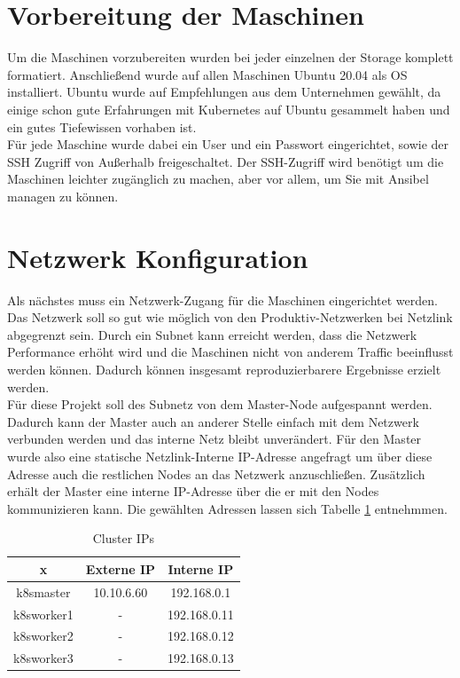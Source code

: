 \section{Vorbereitung der Maschinen}
Um die Maschinen vorzubereiten wurden bei jeder einzelnen der Storage komplett formatiert.
Anschließend wurde auf allen Maschinen Ubuntu 20.04 als \ac{OS} installiert.
Ubuntu wurde auf Empfehlungen aus dem Unternehmen gewählt, da einige schon gute Erfahrungen mit Kubernetes auf Ubuntu gesammelt haben und ein gutes Tiefewissen vorhaben ist.
\\
Für jede Maschine wurde dabei ein User und ein Passwort eingerichtet, sowie der \ac{SSH} Zugriff von Außerhalb freigeschaltet.
Der SSH-Zugriff wird benötigt um die Maschinen leichter zugänglich zu machen, aber vor allem, um Sie mit Ansibel managen zu können.


\section{Netzwerk Konfiguration}
Als nächstes muss ein Netzwerk-Zugang für die Maschinen eingerichtet werden.
Das Netzwerk soll so gut wie möglich von den Produktiv-Netzwerken bei Netzlink abgegrenzt sein.
Durch ein Subnet kann erreicht werden, dass die Netzwerk Performance erhöht wird und die Maschinen nicht von anderem Traffic beeinflusst werden können.
Dadurch können insgesamt reproduzierbarere Ergebnisse erzielt werden. 
\\
Für diese Projekt soll des Subnetz von dem Master-Node aufgespannt werden. 
Dadurch kann der Master auch an anderer Stelle einfach mit dem Netzwerk verbunden werden und das interne Netz bleibt unverändert.
Für den Master wurde also eine statische Netzlink-Interne \ac{IP}-Adresse angefragt um über diese Adresse auch die restlichen Nodes an das Netzwerk anzuschließen.
Zusätzlich erhält der Master eine interne \ac{IP}-Adresse über die er mit den Nodes kommunizieren kann.
Die gewählten Adressen lassen sich Tabelle \ref{table:katanetes_ips} entnehmmen.

\begin{table}
    \centering
    \begin{tabular}[h!]{ c | c c }
        x & Externe \ac{IP} & Interne \ac{IP} \\
        \hline
        k8smaster & 10.10.6.60 & 192.168.0.1 \\
        k8sworker1 & - & 192.168.0.11 \\
        k8sworker2 & - & 192.168.0.12 \\
        k8sworker3 & - & 192.168.0.13 \\
    \end{tabular}
    \caption{Cluster IPs}
    \label{table:katanetes_ips}
\end{table}

